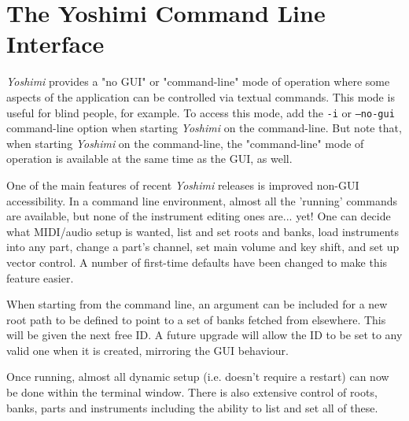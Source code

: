 %
%
%

\section{The Yoshimi Command Line Interface}
\label{sec:command_line}

   \textsl{Yoshimi} provides a "no GUI" or "command-line" mode of operation
   where some aspects of the application can be controlled via textual commands.
   This mode is useful for blind people, for example.  To access this mode, add
   the \texttt{-i} or \texttt{--no-gui} command-line option when starting
   \textsl{Yoshimi} on the command-line.  But note that, when starting
   \textsl{Yoshimi} on the command-line, the "command-line" mode of operation is
   available at the same time as the GUI, as well.

   One of the main features of recent \textsl{Yoshimi} releases
   is improved non-GUI
   accessibility.  In a command line environment, almost all the 'running'
   commands are available, but none of the instrument editing ones are... yet!
   One can decide what MIDI/audio setup is wanted, list and set roots and banks,
   load instruments into any part, change a part's channel, set main volume and
   key shift, and set up vector control.  A number of first-time defaults have
   been changed to make this feature easier.

   When starting from the command line, an argument can be included for a new
   root path to be defined to point to a set of banks fetched from elsewhere.
   This will be given the next free ID. A future upgrade will allow the ID to
   be set to any valid one when it is created, mirroring the GUI behaviour.

   Once running, almost all dynamic setup (i.e. doesn't require a restart) can
   now be done within the terminal window. There is also extensive control of
   roots, banks, parts and instruments including the ability to list and set
   all of these.

